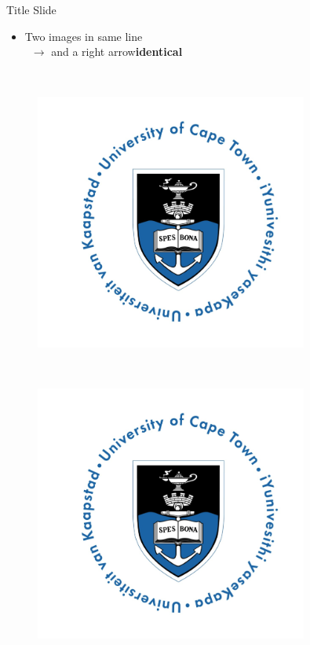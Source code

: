 \documentclass[xcolor=dvipsnames,10pt]{beamer}
\begin{document}

\begin{frame}{Title Slide}
	\begin{itemize}\itemsep15pt
		\item Two images in same line\\
		~\hfill $\rightarrow$ and a right arrow{\bf identical}
	\end{itemize}
	~\\
	\begin{minipage}{0.475\textwidth}
		\begin{figure}[h]
			\includegraphics[width=0.8\textwidth]{Figures/uct.png}
		\end{figure}
	\end{minipage}\begin{minipage}{0.05\textwidth}
		~ \pause
	\end{minipage}\begin{minipage}{0.475\textwidth}
		\begin{figure}[h]
			\includegraphics[width=0.8\textwidth]{Figures/uct.png}

\end{figure}
\end{minipage}
\end{frame}
\end{document}
